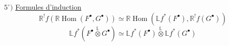 $5^\circ)$ \uline{Formules d'induction}
\[
\boxed{\mathbb{R}^!f(\mathbb{R}\operatorname{Hom}(F^\bullet,G^\bullet))
\simeq \mathbb{R}\operatorname{Hom}(\mathbb{L}f^*(F^\bullet),\mathbb{R}^!f(G^\bullet))}
\]
\[
\boxed{\mathbb{L}f^*(F^\bullet\mathbin{\overset{\mathbb{L}}{\otimes}}G^\bullet)
\simeq \mathbb{L}f^*(F^\bullet)\mathbin{\overset{\mathbb{L}}{\otimes}}\mathbb{L}f^*(G^\bullet)}
\]
